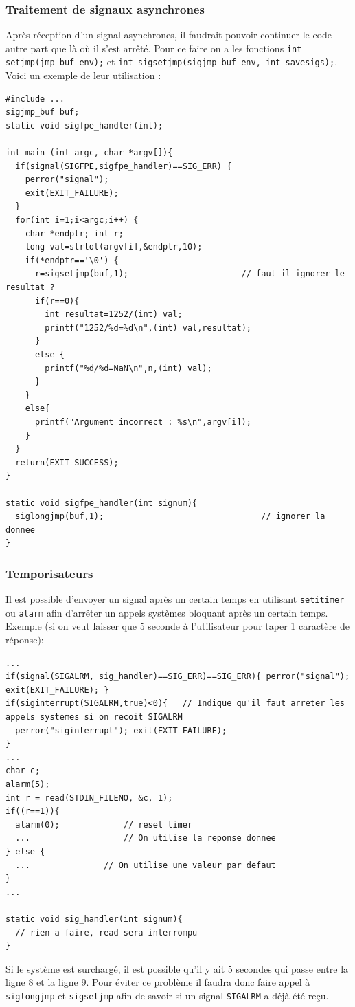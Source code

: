 \subsubsection{Traitement de signaux asynchrones}
Après réception d'un signal asynchrones, il faudrait pouvoir continuer le code autre part que là où il s'est arrêté. Pour ce faire on a les fonctions \texttt{int setjmp(jmp\_buf env);} et \texttt{int sigsetjmp(sigjmp\_buf env, int savesigs);}. Voici un exemple de leur utilisation :
\begin{lstlisting}
#include ...
sigjmp_buf buf;
static void sigfpe_handler(int);

int main (int argc, char *argv[]){
  if(signal(SIGFPE,sigfpe_handler)==SIG_ERR) {
    perror("signal");
    exit(EXIT_FAILURE);
  }
  for(int i=1;i<argc;i++) {
    char *endptr; int r;
    long val=strtol(argv[i],&endptr,10);
    if(*endptr=='\0') {
      r=sigsetjmp(buf,1);						// faut-il ignorer le resultat ?
      if(r==0){
        int resultat=1252/(int) val;
        printf("1252/%d=%d\n",(int) val,resultat);
      }
      else {
        printf("%d/%d=NaN\n",n,(int) val);
      }
    }
    else{
      printf("Argument incorrect : %s\n",argv[i]);
    }
  }
  return(EXIT_SUCCESS);
}

static void sigfpe_handler(int signum){
  siglongjmp(buf,1);								// ignorer la donnee
}
\end{lstlisting}
\subsubsection{Temporisateurs}
Il est possible d'envoyer un signal après un certain temps en utilisant \texttt{setitimer} ou \texttt{alarm} afin d'arrêter un appels systèmes bloquant après un certain temps. Exemple (si on veut laisser que 5 seconde à l'utilisateur pour taper 1 caractère de réponse):
\begin{lstlisting}
...
if(signal(SIGALRM, sig_handler)==SIG_ERR)==SIG_ERR){ perror("signal"); exit(EXIT_FAILURE); }
if(siginterrupt(SIGALRM,true)<0){	// Indique qu'il faut arreter les appels systemes si on recoit SIGALRM
  perror("siginterrupt"); exit(EXIT_FAILURE);
}
...
char c;
alarm(5);
int r = read(STDIN_FILENO, &c, 1);
if((r==1)){
  alarm(0); 			// reset timer
  ...					// On utilise la reponse donnee
} else {
  ... 				// On utilise une valeur par defaut
}
...

static void sig_handler(int signum){
  // rien a faire, read sera interrompu
}
\end{lstlisting}
Si le système est surchargé, il est possible qu'il y ait 5 secondes qui passe entre la ligne 8 et la ligne 9. Pour éviter ce problème il faudra donc faire appel à \texttt{siglongjmp} et \texttt{sigsetjmp} afin de savoir si un signal \texttt{SIGALRM} a déjà été reçu.
